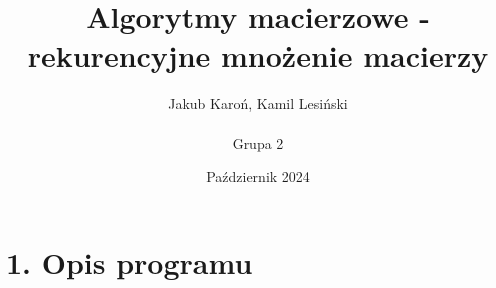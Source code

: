 \documentclass{article}
\title{Algorytmy macierzowe - rekurencyjne mnożenie macierzy}
\author{Jakub Karoń, Kamil Lesiński \\\\ Grupa 2}
\date{Październik 2024}
\begin{document}
\maketitle

\section*{1. Opis programu}
\end{document}
